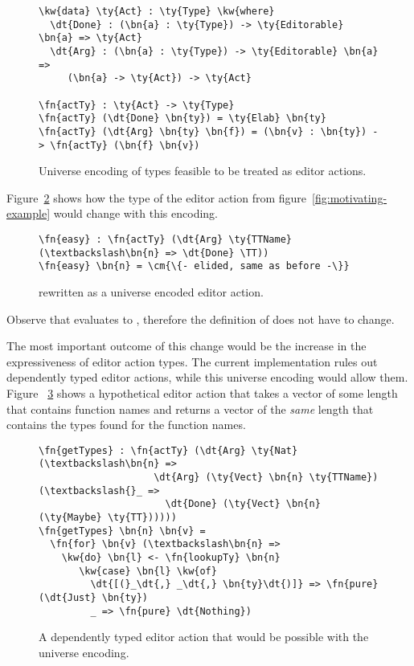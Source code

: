 \begin{figure}[H]
\begin{Verbatim}
\kw{data} \ty{Act} : \ty{Type} \kw{where}
  \dt{Done} : (\bn{a} : \ty{Type}) -> \ty{Editorable} \bn{a} => \ty{Act}
  \dt{Arg} : (\bn{a} : \ty{Type}) -> \ty{Editorable} \bn{a} =>
     (\bn{a} -> \ty{Act}) -> \ty{Act}

\fn{actTy} : \ty{Act} -> \ty{Type}
\fn{actTy} (\dt{Done} \bn{ty}) = \ty{Elab} \bn{ty}
\fn{actTy} (\dt{Arg} \bn{ty} \bn{f}) = (\bn{v} : \bn{ty}) -> \fn{actTy} (\bn{f} \bn{v})
\end{Verbatim}
\caption{Universe encoding of types feasible to be treated as editor actions.}
\label{code:universe}
\end{figure}

Figure~\ref{code:universe-example} shows how the type of the  editor
action from figure~\ref{fig:motivating-example} would change with this encoding.

\begin{figure}[H]
\begin{Verbatim}
\fn{easy} : \fn{actTy} (\dt{Arg} \ty{TTName} (\textbackslash\bn{n} => \dt{Done} \TT))
\fn{easy} \bn{n} = \cm{\{- elided, same as before -\}}
\end{Verbatim}
\caption{ rewritten as a universe encoded editor action.}
\label{code:universe-example}
\end{figure}

Observe that  evaluates
to , therefore the definition of  does
not have to change.

The most important outcome of this change would be the increase in the
expressiveness of editor action types. The current implementation rules out
dependently typed editor actions, while this universe encoding would allow
them. Figure ~\ref{code:universe-dependent} shows a
hypothetical editor action that takes a vector of some length that contains
function names and returns a vector of the \emph{same} length that contains the types
found for the function names.

\begin{figure}[H]
\begin{Verbatim}
\fn{getTypes} : \fn{actTy} (\dt{Arg} \ty{Nat} (\textbackslash\bn{n} =>
                    \dt{Arg} (\ty{Vect} \bn{n} \ty{TTName}) (\textbackslash{}_ =>
                      \dt{Done} (\ty{Vect} \bn{n} (\ty{Maybe} \ty{TT})))))
\fn{getTypes} \bn{n} \bn{v} =
  \fn{for} \bn{v} (\textbackslash\bn{n} =>
    \kw{do} \bn{l} <- \fn{lookupTy} \bn{n}
       \kw{case} \bn{l} \kw{of}
         \dt{[(}_\dt{,} _\dt{,} \bn{ty}\dt{)]} => \fn{pure} (\dt{Just} \bn{ty})
         _ => \fn{pure} \dt{Nothing})
\end{Verbatim}
\caption{A dependently typed editor action that would be possible with the universe encoding.}
\label{code:universe-dependent}
\end{figure}

